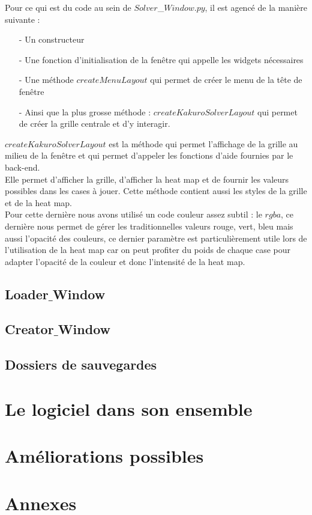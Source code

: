 \documentclass[12pt]{article}
\begin{document}
Pour ce qui est du code au sein de $Solver$\_$Window.py$, il est agencé de la manière suivante : \\ 
\begin{itemize}
\item[-] Un constructeur 
\item[-] Une fonction d'initialisation de la fenêtre qui appelle les widgets nécessaires
\item[-] Une méthode $createMenuLayout$ qui permet de créer le menu de la tête de fenêtre
\item[-] Ainsi que la plus grosse méthode : $createKakuroSolverLayout$ qui permet de créer la grille centrale et d'y interagir. \\
\end{itemize}

$createKakuroSolverLayout$ est la méthode qui permet l'affichage de la grille au milieu de la fenêtre et qui permet d'appeler les fonctions d'aide fournies par le back-end. \\
Elle permet d'afficher la grille, d'afficher la heat map et de fournir les valeurs possibles dans les cases à jouer. Cette méthode contient aussi les styles de la grille et de la heat map. \\
Pour cette dernière nous avons utilisé un code couleur assez subtil : le $rgba$, ce dernière nous permet de gérer les traditionnelles valeurs rouge, vert, bleu mais aussi l'opacité des couleurs, ce dernier paramètre est particulièrement utile lors de l'utilisation de la heat map car on peut profiter du poids de chaque case pour adapter l'opacité de la couleur et donc l'intensité de la heat map. \\ 



\subsection{Loader$\_$Window}
\subsection{Creator$\_$Window}
\subsection{Dossiers de sauvegardes}

\section{Le logiciel dans son ensemble}
\section{Améliorations possibles}


\section{Annexes}
\end{document}
